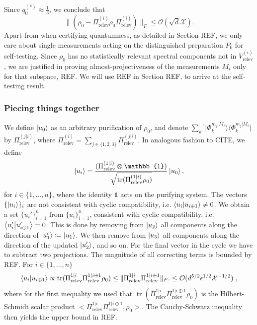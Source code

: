 Since $q_0^{(*)}\approx\frac{1}{3}$, we conclude that
\begin{equation}
\|(\rho_{0}-\Pi_{\text{relev}}^{(i)}\rho_{0}\Pi_{\text{relev}}^{(i)})\|_F \leq \mathcal{O}(\sqrt{d}\mathcal{X}).
\end{equation}
Apart from when certifying quantumness, as detailed in Section REF, we only care about single measurements acting on the distinguished preparation $P_0$ for self-testing. Since $\rho_0$ has no statistically relevant spectral components not in $V_{\text{relev}}^{(i)}$, we are justified in proving almost-projectiveness of the measurements $M_i$ only for that subspace, REF. We will use REF in Section REF, to arrive at the self-testing result.
\subsubsection{Piecing things together}
We define $\ket{u_0}$ as an arbitrary purification of $\rho_0$, and denote $\sum_{k}{}^{'}\vert \Phi_k^{m_j\vert M_i}\rangle \langle \Phi_k^{m_j\vert M_i}\vert$ by $\Pi_{\text{relev}}^{(j\vert i)}$, where $\Pi_{\text{relev}}^{(i)}=\sum_{j\in\{1,2,3\}}\Pi_{\text{relev}}^{(j\vert i)}$. In analogous fashion to CITE, we define
\begin{equation}
\ket{u_i} = \frac{(\Pi_{\text{relev}}^{(1\vert i)}\otimes\mathbb{1})}{\sqrt{\operatorname{tr}(\Pi_{\text{relev}}^{(1\vert i)}\rho_0)}}\ket{u_0},
\end{equation}
for $i\in\{1,\dots,n\}$, where the identity $\mathbb{1}$ acts on the purifying system. The vectors $\{\ket{u_i}\}_i$ are not consistent with cyclic compatibility, i.e. $\bra{u_i}\ket{u_{i\oplus 1}}\neq 0$.
We obtain a set $\{u_i'\}_{i=1}^n$ from $\{u_i\}_{i=1}^n$, consistent with cyclic compatibility, i.e. $\bra{u_i'}\ket{u_{i\oplus 1}'}=0$. This is done by removing from $\ket{u_2}$ all components along the direction of $\ket{u_1'}\coloneqq\ket{u_1}$. We then remove from $\ket{u_3}$ all components along the direction of the updated $\ket{u_2'}$, and so on. For the final vector in the cycle we have to subtract two projections. The magnitude of all correcting terms is bounded by REF.
For $i\in\{1,\dots,n\}$
\begin{equation}
\bra{u_i}\ket{u_{i\oplus 1}}\propto\operatorname{tr}(\Pi_{\text{relev}}^{1\vert i}\Pi_{\text{relev}}^{1\vert i\oplus 1}\rho_0) \leq \|\Pi_{\text{relev}}^{1\vert i}\Pi_{\text{relev}}^{1\vert i\oplus 1}\|_F. \leq \mathcal{O}(d^{5/2}\epsilon^{1/2}\mathcal{X}^{-1/2})\; ,
\end{equation}
where for the first inequality we used that $\operatorname{tr}(\Pi_{\text{relev}}^{1\vert i}\Pi_{\text{relev}}^{1\vert i\oplus 1}\rho_0)$ is the Hilbert-Schmidt scalar product $<\Pi_{\text{relev}}^{1\vert i}\Pi_{\text{relev}}^{1\vert i\oplus 1},\rho_0>$. The Cauchy-Schwarz inequality then yields the upper bound in REF.

